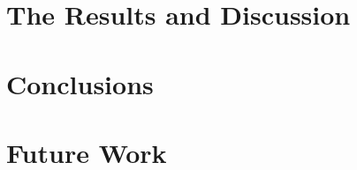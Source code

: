 \documentclass[a4paper,10pt,twoside]{report}
\begin{document}
\chapter{The Results and Discussion}\label{chapter:Results}

\clearemptydoublepage

\chapter{Conclusions}\label{chapter:Conclusions}

\clearemptydoublepage

\chapter{Future Work}\label{chapter:FutureWork}


\clearemptydoublepage


%



\clearpage

{}
\appendix


\end{document}
